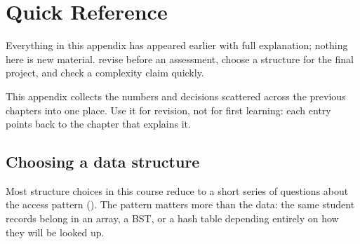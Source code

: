 \chapter{Quick Reference}\label{ch:reference}

\chapterguide%
  {Everything in this appendix has appeared earlier with full explanation; nothing here is new material.}
  {revise before an assessment, choose a structure for the final project, and check a complexity claim quickly.}

This appendix collects the numbers and decisions scattered across the previous chapters into
one place. Use it for revision, not for first learning: each entry points back to the chapter
that explains it.

\section{Choosing a data structure}

Most structure choices in this course reduce to a short series of questions about the access
pattern (). The pattern matters more than the data: the same student
records belong in an array, a BST, or a hash table depending entirely on how they will be
looked up.

